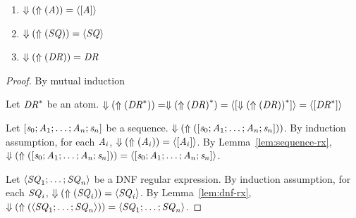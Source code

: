 \documentclass[numbers]{sigplanconf}
\begin{document}
\begin{lemma}\leavevmode
\begin{enumerate}
\item $\Downarrow(\Uparrow(\mathit{A}))=\langle[\mathit{A}]\rangle$
\item $\Downarrow(\Uparrow(\mathit{SQ}))=\langle\mathit{SQ}\rangle$
\item $\Downarrow(\Uparrow(\mathit{DR}))=\mathit{DR}$
\end{enumerate}
\end{lemma}
\begin{proof}
By mutual induction

Let ${\mathit{DR}}^*$ be an atom.
$\Downarrow(\Uparrow({\mathit{DR}}^*))=
\Downarrow({\Uparrow(\mathit{DR})}^*)=
\langle[{\Downarrow(\Uparrow(\mathit{DR}))}^*]\rangle=
\langle[{\mathit{DR}}^*]\rangle$

Let $[\mathit{s}_0;\mathit{A}_1;\ldots
;\mathit{A}_n;\mathit{s}_n]$ be a sequence.
$\Downarrow(\Uparrow([\mathit{s}_0;\mathit{A}_1;\ldots
;\mathit{A}_n;\mathit{s}_n]))$.
By induction assumption, for each $\mathit{A}_i$,
$\Downarrow(\Uparrow(\mathit{A}_i))=\langle[\mathit{A}_i]\rangle$.
By Lemma~\ref{lem:sequence-rx},
$\Downarrow(\Uparrow([\mathit{s}_0;\mathit{A}_1;\ldots
;\mathit{A}_n;\mathit{s}_n]))=
\langle[\mathit{s}_0;\mathit{A}_1;\ldots
;\mathit{A}_n;\mathit{s}_n]\rangle$.

Let $\langle\mathit{SQ}_1;\ldots;\mathit{SQ}_n\rangle$ be a DNF
regular expression.
By induction assumption, for each $\mathit{SQ}_i$,
$\Downarrow(\Uparrow(\mathit{SQ}_i))=\langle\mathit{SQ}_i\rangle$.
By Lemma~\ref{lem:dnf-rx},
$\Downarrow(\Uparrow(\langle\mathit{SQ}_1;\ldots;\mathit{SQ}_n\rangle))=
\langle\mathit{SQ}_1;\ldots;\mathit{SQ}_n\rangle$.

\end{proof}




\end{document}

